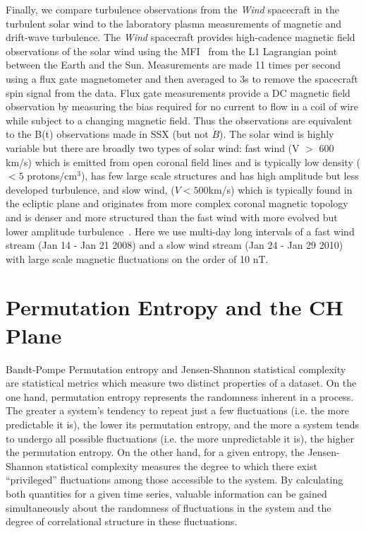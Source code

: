 \documentclass[aps,prx,twocolumn,secnumarabic,nobalancelastpage,amsmath,amssymb,
nofootinbib]{revtex4-1}
\begin{document}
Finally, we compare turbulence observations from the {\it Wind} spacecraft in the turbulent solar wind to the laboratory plasma measurements of magnetic and drift-wave turbulence. The {\it Wind} spacecraft provides high-cadence magnetic field observations of the solar wind using the MFI~\cite{lepping1995} from the L1 Lagrangian point between the Earth and the Sun. Measurements are made 11 times per second using a flux gate magnetometer and then averaged to 3s to remove the spacecraft spin signal from the data. Flux gate measurements provide a DC magnetic field observation by measuring the bias required for no current to flow in a coil of wire while subject to a changing magnetic field. Thus the observations are equivalent to the B(t) observations made in SSX (but not $\dot{B}$). The solar wind is highly variable but there are broadly two types of solar wind: fast wind (V $>$ 600 km/s) which is emitted from open coronal field lines and is typically low density ($< 5$ protons/cm$^3$), has few large scale structures and has high amplitude but less developed turbulence, and slow wind, ($V < 500 $km/s) which is typically found in the ecliptic plane and originates from more complex coronal magnetic topology and is denser and more structured than the fast wind with more evolved but lower amplitude turbulence~\cite{tu1990,bruno2013}. Here we use multi-day long intervals of a fast wind stream (Jan 14 - Jan 21 2008) and a slow wind stream (Jan 24 - Jan 29 2010) with large scale magnetic fluctuations on the order of 10 nT. 



\section{Permutation Entropy and the CH Plane}
Bandt-Pompe Permutation entropy and Jensen-Shannon statistical complexity are statistical metrics which measure two distinct properties of a dataset. On the one hand, permutation entropy represents the randomness inherent in a process. The greater a system’s tendency to repeat just a few fluctuations (i.e. the more predictable it is), the lower its permutation entropy, and the more a system tends to undergo all possible fluctuations (i.e. the more unpredictable it is), the higher the permutation entropy. On the other hand, for a given entropy, the Jensen-Shannon statistical complexity measures the degree to which there exist “privileged” fluctuations among those accessible to the system. By calculating both quantities for a given time series, valuable information can be gained simultaneously about the randomness of fluctuations in the system and the degree of correlational structure in these fluctuations. 
\end{document}
